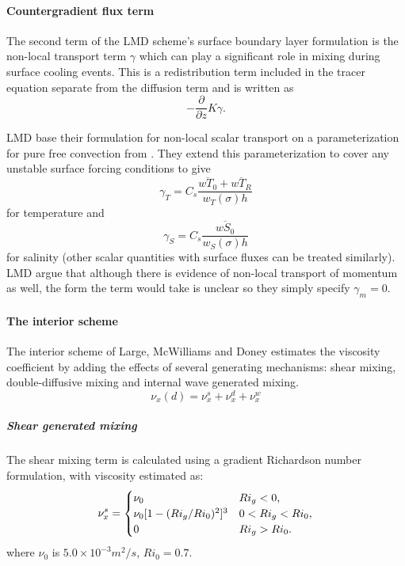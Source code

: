 \paragraph{Countergradient flux term}
The second term of the LMD scheme's surface boundary layer
formulation is the non-local transport term $\gamma$ which can play a
significant role in mixing during surface cooling events.  This is a
redistribution term included in the tracer equation separate from the
diffusion term and is written as 
\begin{equation}
-\frac{\partial}{\partial z}K\gamma.
\end{equation}

LMD base their formulation for non-local scalar transport on a
parameterization for pure free convection from
\citet{Mailhot82}. They extend this parameterization to cover any
unstable surface forcing conditions to give
\begin{equation}
  \gamma_{T}=C_s\frac{\overline{wT_0}+
  \overline{wT_R}}{w_T(\sigma)h}
\end{equation}
for temperature and 
\begin{equation}
\gamma_S=C_s \frac{\overline{wS_0}}{w_S(\sigma)h}
\end{equation}
for salinity (other scalar quantities with surface fluxes can be
treated similarly). LMD argue that although there is evidence of
non-local transport of momentum as well, the form the term would take
is unclear so they simply specify $\gamma_m=0$.

\paragraph{The interior scheme}
The interior scheme of Large, McWilliams and Doney estimates the
viscosity coefficient by adding the effects of several generating
mechanisms:  shear mixing, double-diffusive mixing and internal wave
generated mixing.
\begin{equation}
\nu_{x}(d)=\nu_{x}^s+\nu_{x}^d+\nu_{x}^w
\end{equation}

\subparagraph{Shear generated mixing}
The shear mixing term is calculated using a
gradient Richardson number formulation,
with viscosity estimated as: 
\begin{equation}
\nu^s_x=\begin{cases}
\nu_0&   \text{$ Ri_g<0$}, \\
\nu_0[1-(Ri_g/Ri_0)^2]^3&  \text{$0< Ri_g<Ri_0$},  \\
0&   \text{$Ri_g>Ri_0$}.  
\end{cases}
\end{equation}
where $\nu_0$ is $5.0 \times 10^{-3} m^2/s$, $Ri_0 = 0.7$.  

